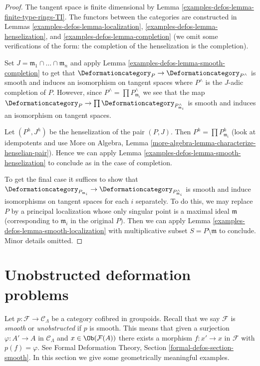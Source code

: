 \begin{proof}
The tangent space is finite dimensional by
Lemma \ref{examples-defos-lemma-finite-type-rings-TI}.
The functors between the categories are constructed
in Lemmas \ref{examples-defos-lemma-localization}, \ref{examples-defos-lemma-henselization}, and
\ref{examples-defos-lemma-completion} (we omit some verifications of the form:
the completion of the henselization is the completion).

\medskip\noindent
Set $J = \mathfrak m_1 \cap \ldots \cap \mathfrak m_n$ and apply
Lemma \ref{examples-defos-lemma-smooth-completion} to get that
$\Deformationcategory_P \to \Deformationcategory_{P^\wedge}$
is smooth and induces an isomorphism on tangent spaces
where $P^\wedge$ is the $J$-adic completion of $P$.
However, since $P^\wedge = \prod P_{\mathfrak m_i}^\wedge$
we see that the map $\Deformationcategory_P \to
\prod \Deformationcategory_{P_{\mathfrak m_i}^\wedge}$
is smooth and induces an isomorphism on tangent spaces.

\medskip\noindent
Let $(P^h, J^h)$ be the henselization of the pair $(P, J)$.
Then $P^h = \prod P_{\mathfrak m_i}^h$ (look at idempotents
and use More on Algebra, Lemma
\ref{more-algebra-lemma-characterize-henselian-pair}).
Hence we can apply Lemma \ref{examples-defos-lemma-smooth-henselization}
to conclude as in the case of completion.

\medskip\noindent
To get the final case it suffices to show that
$\Deformationcategory_{P_{\mathfrak m_i}} \to
\Deformationcategory_{P_{\mathfrak m_i}^\wedge}$
is smooth and induce isomorphisms on tangent spaces for each $i$ separately.
To do this, we may replace $P$ by a principal localization
whose only singular point is a maximal ideal $\mathfrak m$
(corresponding to $\mathfrak m_i$ in the original $P$).
Then we can apply
Lemma \ref{examples-defos-lemma-smooth-localization}
with multiplicative subset $S = P \setminus \mathfrak m$ to conclude.
Minor details omitted.
\end{proof}

\section{Unobstructed deformation problems}
\label{examples-defos-section-unobstructed}
Let $p : \mathcal{F} \to \mathcal{C}_\Lambda$ be a
category cofibred in groupoids. Recall that we say $\mathcal{F}$
is {\it smooth} or {\it unobstructed} if $p$ is smooth.
This means that given a surjection $\varphi : A' \to A$ in
$\mathcal{C}_\Lambda$ and $x \in \Ob(\mathcal{F}(A))$
there exists a morphism $f : x' \to x$ in $\mathcal{F}$
with $p(f) = \varphi$.
See Formal Deformation Theory, Section \ref{formal-defos-section-smooth}.
In this section we give some geometrically meaningful examples.

